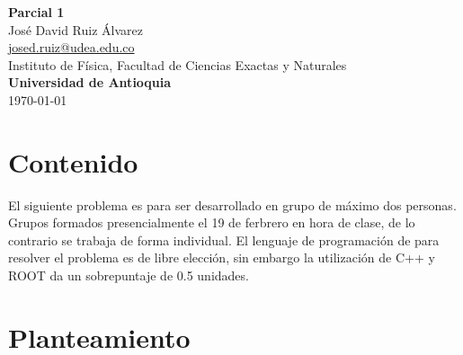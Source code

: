 \documentclass[10.5pt]{article}
\begin{document}
\noindent
\begin{minipage}[b]{0.75\linewidth}
{\LARGE\bf Parcial 1}\\ %
\large{Jos\'{e} David Ruiz \'{A}lvarez} \\
\small{\href{mailto:josed.ruiz@udea.edu.co}{josed.ruiz@udea.edu.co}} \\ %
\normalsize{Instituto de Física, Facultad de Ciencias Exactas y Naturales} \\%
\normalsize{\bf Universidad de Antioquia} \\[8mm]
\today %
\end{minipage}%



\section{Contenido}

El siguiente problema es para ser desarrollado en grupo de m\'{a}ximo dos personas. Grupos formados presencialmente el 19 de ferbrero en hora de clase, de lo contrario se trabaja de forma individual. El lenguaje de programaci\'{o}n de para resolver el problema es de libre elecci\'{o}n, sin embargo la utilizaci\'{o}n de C++ y ROOT da un sobrepuntaje de 0.5 unidades.

\section{Planteamiento}
\end{document}
